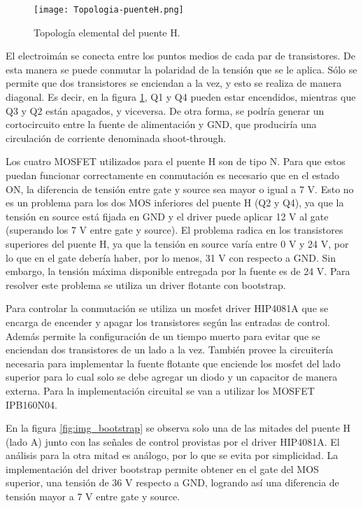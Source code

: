 \begin{figure}[H]
	\centering
	\texttt{[image: Topologia-puenteH.png]}
	\caption{Topología elemental del puente H.}
	\label{fig:img_topologia-puenteH}
\end{figure}

\noindent El electroimán se conecta entre los puntos medios de cada par de transistores. De esta manera se puede conmutar la polaridad de la tensión que se le aplica. Sólo se permite que dos transistores se enciendan a la vez, y esto se realiza de manera diagonal. Es decir, en la figura \ref{fig:img_topologia-puenteH}, Q1 y Q4 pueden estar encendidos, mientras que Q3 y Q2 están apagados, y viceversa. De otra forma, se podría generar un cortocircuito entre la fuente de alimentación y GND, que produciría una circulación de corriente denominada shoot-through. 


\noindent Los cuatro MOSFET utilizados para el puente H son de tipo N. Para que estos puedan funcionar correctamente en conmutación es necesario que en el estado ON, la diferencia de tensión entre gate y source sea mayor o igual a 7 V. Esto no es un problema para los dos MOS inferiores del puente H (Q2 y Q4), ya que la tensión en source está fijada en GND y el driver puede aplicar 12 V al gate (superando los 7 V entre gate y source). El problema radica en los transistores superiores del puente H, ya que la tensión en source varía entre 0 V y 24 V, por lo que en el gate debería haber, por lo menos, 31 V con respecto a GND. Sin embargo, la tensión máxima disponible entregada por la fuente es de 24 V. Para resolver este problema se utiliza un driver flotante con bootstrap.

\noindent Para controlar la conmutación se utiliza un mosfet driver HIP4081A  que se encarga de encender y apagar los transistores según las entradas de control. Además permite la configuración de un tiempo muerto para evitar que se enciendan dos transistores de un lado a la vez. También provee la circuitería necesaria para implementar la fuente flotante que enciende los mosfet del lado superior para lo cual solo se debe agregar un diodo y un capacitor de manera externa. Para la implementación circuital se van a utilizar los MOSFET IPB160N04.

\noindent En la figura \ref{fig:img_bootstrap} se observa solo una de las mitades del puente H (lado A)  junto con las señales de control provistas por el driver HIP4081A. El análisis para la otra mitad es análogo, por lo que se evita por simplicidad. La implementación del driver bootstrap permite obtener en el gate del MOS superior, una tensión de 36 V respecto a GND, logrando así una diferencia de tensión mayor a 7 V entre gate y source. 

